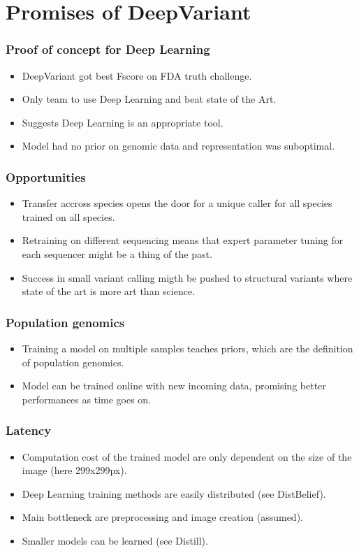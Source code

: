 \documentclass{beamer}
\begin{document}
\section{Promises of DeepVariant}

\begin{frame}
    \frametitle{Proof of concept for Deep Learning}

    \begin{itemize}
        \item DeepVariant got best Fscore on FDA truth challenge.
        \item Only team to use Deep Learning and beat state of the Art.
        \item Suggests Deep Learning is an appropriate tool.
        \item Model had no prior on genomic data and representation was suboptimal.
    \end{itemize}
\end{frame}

\begin{frame}
    \frametitle{Opportunities}

    \begin{itemize}
        \item Transfer accross species opens the door for a unique caller for all species trained on
            all species.
        \item Retraining on different sequencing means that expert parameter tuning for each
            sequencer might be a thing of the past.
        \item Success in small variant calling migth be pushed to structural variants where state of
            the art is more art than science.
    \end{itemize}
\end{frame}

\begin{frame}
    \frametitle{Population genomics}

    \begin{itemize}
        \item Training a model on multiple samples teaches priors, which are the definition of
            population genomics.
        \item Model can be trained online with new incoming data, promising better performances as
            time goes on.
    \end{itemize}
\end{frame}

\begin{frame}
    \frametitle{Latency}

    \begin{itemize}
        \item Computation cost of the trained model are only dependent on the size of the image
            (here 299x299px).
        \item Deep Learning training methods are easily distributed (see DistBelief).
        \item Main bottleneck are preprocessing and image creation (assumed).
        \item Smaller models can be learned (see Distill).
    \end{itemize}
\end{frame}
\end{document}
